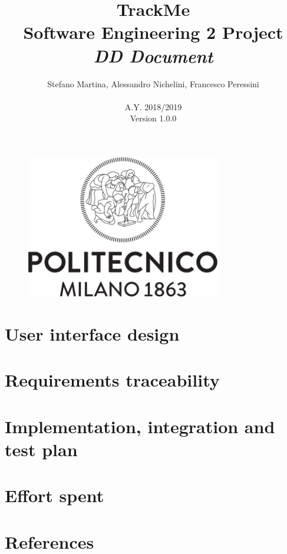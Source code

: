 \documentclass{article}
\begin{document}
	\begin{figure}[t]
	\centering
	\includegraphics[height=6.25cm,keepaspectratio]{Figures/logo}
	\end{figure}
	
	\title{TrackMe \\ Software Engineering 2 Project \\ 
			\textit{DD Document} }
	\author{Stefano Martina, Alessandro Nichelini, Francesco Peressini
		\\ \\ A.Y. 2018/2019 \\ Version 1.0.0}
		
\maketitle
\newpage

\tableofcontents

\newpage






\section{User interface design}

\section{Requirements traceability}

\section{Implementation, integration and test plan}
 
\section{Effort spent}

\section{References}
\newpage


 
\end{document}
